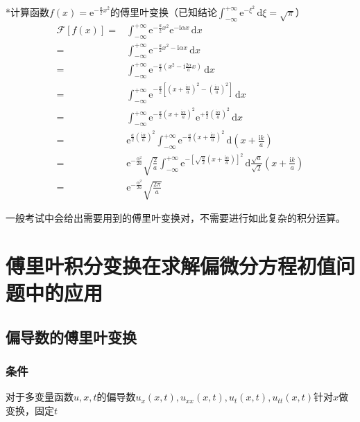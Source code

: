 *计算函数\(f(x)=\mathrm{e}^{-\frac{a}{2}x^2}\)的傅里叶变换（已知结论\(\int_{-\infty}^{+\infty}\mathrm{e}^{-\xi^2}\,\mathrm{d}\xi=\sqrt\pi\)）
\begin{align*}
\mathscr{F}[f(x)]=&\int_{-\infty}^{+\infty}\mathrm{e}^{-\frac{a}{2}x^2}\mathrm{e}^{-\mathrm{i}\alpha x}\,\mathrm{d}x\\
=&\int_{-\infty}^{+\infty}\mathrm{e}^{-\frac{a}{2}x^2-\mathrm{i}\alpha x}\,\mathrm{d}x\\
=&\int_{-\infty}^{+\infty}\mathrm{e}^{-\frac{a}{2}(x^2-\mathrm{i}\frac{2\alpha}{a} x)}\,\mathrm{d}x\\
=&\int_{-\infty}^{+\infty}\mathrm{e}^{-\frac{a}{2}\left[\left(x+\frac{\mathrm{i}\alpha}{a}\right)^2-\left(\frac{\mathrm{i}\alpha}{a}\right)^2\right]}\,\mathrm{d}x\\
=&\int_{-\infty}^{+\infty}\mathrm{e}^{-\frac{a}{2}\left(x+\frac{\mathrm{i}\alpha}{a}\right)^2}\mathrm{e}^{+\frac{a}{2}\left(\frac{\mathrm{i}\alpha}{a}\right)^2}\,\mathrm{d}x\\
=&\mathrm{e}^{\frac{a}{2}\left(\frac{\mathrm{i}\alpha}{a}\right)^2}\int_{-\infty}^{+\infty}\mathrm{e}^{-\frac{a}{2}\left(x+\frac{\mathrm{i}\alpha}{a}\right)^2}\,\mathrm{d}\left(x+\tfrac{\mathrm{i}k}{a}\right)\\
=&\mathrm{e}^{-\frac{\alpha^2}{2a}}\sqrt{\tfrac{2}{a}}\int_{-\infty}^{+\infty}\mathrm{e}^{-\left[\sqrt{\frac{a}{2}}\left(x+\frac{\mathrm{i}\alpha}{a}\right)\right]^2}\,\mathrm{d}\tfrac{\sqrt{a}}{\sqrt{2}}\left(x+\tfrac{\mathrm{i}k}{a}\right)\\
=&\mathrm{e}^{-\frac{\alpha^2}{2a}}\sqrt{\tfrac{2\pi}{a}}
\end{align*}

一般考试中会给出需要用到的傅里叶变换对，不需要进行如此复杂的积分运算。

\section{傅里叶积分变换在求解偏微分方程初值问题中的应用}

\subsection{偏导数的傅里叶变换}

\subsubsection{条件}

对于多变量函数\(u,x,t\)的偏导数\(u_x(x,t),u_{xx}(x,t),u_t(x,t),u_{tt}(x,t)\)针对\(x\)做变换，固定\(t\)

